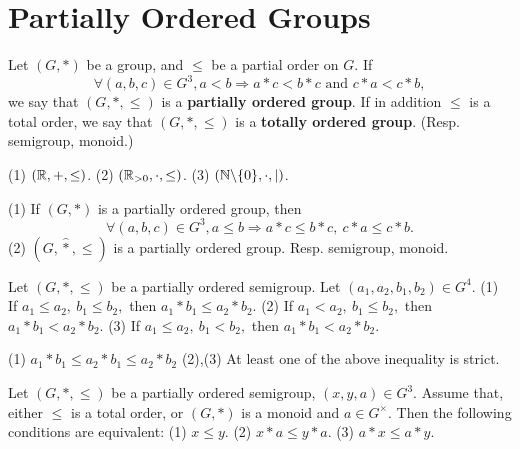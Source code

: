 \section{Partially Ordered Groups}
\begin{definitionenv}
    Let $(G,*)$ be a group, and $\le $ be a partial order on $G$. If 
    $$\forall (a,b,c)\in G^3,a<b\Rightarrow a*c<b*c \text{ and } c*a<c*b,$$
    we say that $(G,*,\le)$ is a \textbf{partially ordered group}. If in addition $\le $ is a total order, we say that $(G,*,\le)$ is a \textbf{totally ordered group}. (Resp. semigroup, monoid.)
\end{definitionenv}
\begin{exampleenv}
    \quad
    (1) $(\mathbb{R},+,\le)$.
    \quad
    (2) $(\mathbb{R}_{>0},\cdot,\le)$.
    \quad
    (3) $(\mathbb{N}\backslash\{0\},\cdot,\mid)$.
\end{exampleenv}
\begin{remark}
    \quad
    \newline
    (1) If $(G,*)$ is a partially ordered group, then 
    $$\forall (a,b,c)\in G^3,a\le b\Rightarrow a*c\le b*c,\ c*a\le c*b.$$
    (2) $(G,\hat{*},\le )$ is a partially ordered group.
    \newline
    Resp. semigroup, monoid.
\end{remark}
\begin{propositionenv}
    \quad\newline
    Let $(G,*,\le)$ be a partially ordered semigroup.  Let $(a_1,a_2,b_1,b_2)\in G^4$. 
    \newline
    (1) If $a_1\le a_2,\ b_1\le b_2,$ then $a_1*b_1\le a_2*b_2.$
    \newline
    (2) If $a_1< a_2,\ b_1\le b_2,$ then $a_1*b_1< a_2*b_2.$
    \newline
    (3) If $a_1\le a_2,\ b_1<b_2,$ then $a_1*b_1< a_2*b_2.$
\end{propositionenv}
\begin{proofenv}
    \quad \newline
    (1) $a_1*b_1\le a_2*b_1\le a_2*b_2$
    \newline
    (2),(3) At least one of the above inequality is strict.
\end{proofenv}
\begin{propositionenv}
    Let $(G,*,\le)$ be a partially ordered semigroup, $(x,y,a)\in G^3$. Assume that, either $\le $ is a total order, or $(G,*)$ is a monoid and $a\in G^\times$. Then the following conditions are equivalent:
    \newline
    (1) $x\le y$.
    \newline
    (2) $x*a\le y*a$.
    \newline
    (3) $a*x\le a*y$.
\end{propositionenv}
